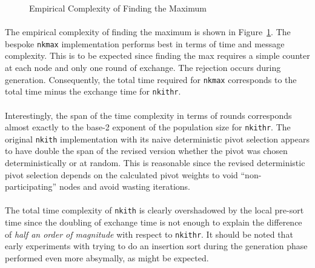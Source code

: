 \documentclass[11pt,epsf]{article}
\begin{document}
{{{\begin{figure}
        \caption{Empirical Complexity of Finding the Maximum}
        \label{fig:maxcplx}
      \end{figure}
    }
    \paragraph{}{
      The empirical complexity of finding the maximum is shown in Figure~\ref{fig:maxcplx}.
      The bespoke \texttt{nkmax} implementation performs best in terms of time and
      message complexity. This is to be expected since finding the max requires a
      simple counter at each node and only one round of exchange. The rejection
      occurs during generation. Consequently, the total time required for \texttt{nkmax}
      corresponds to the total time minus the exchange time for \texttt{nkithr}.
    }
    \paragraph{}{
      Interestingly, the span of the time complexity in terms of rounds corresponds
      almost exactly to the base-2 exponent of the population size for \texttt{nkithr}.
      The original \texttt{nkith} implementation with its naive deterministic pivot
      selection appears to have double the span of the revised version whether the pivot
      was chosen deterministically or at random. This is reasonable since the revised
      deterministic pivot selection depends on the calculated pivot weights to void
      ``non-participating'' nodes and avoid wasting iterations.
    }
    \paragraph{}{
      The total time complexity of \texttt{nkith} is clearly overshadowed by the
      local pre-sort time since the doubling of exchange time is not enough to
      explain the difference of \emph{half an order of magnitude} with respect to
      \texttt{nkithr}. It should be noted that early experiments with trying to do
      an insertion sort during the generation phase performed even more absymally,
      as might be expected.
    }
  }
}
\end{document}
